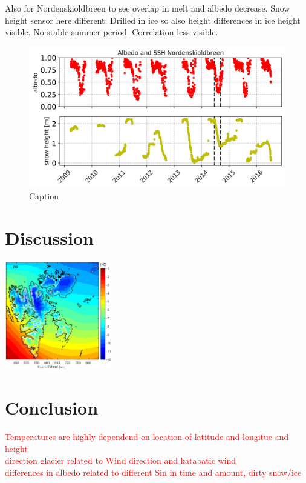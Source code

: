 \documentclass[11pt]{report}
\begin{document}
Also for Nordenskioldbreen to see overlap in melt and albedo decrease. Snow height sensor here different: Drilled in ice so also height differences in ice height visible. No stable summer period. Correlation less visible.

\begin{figure}[h]
\includegraphics[scale=1, width=1\textwidth]{Picture3.jpg}

\caption{Caption}
\label{fig: S3}
\end{figure}

\chapter{Discussion}\label{sec:discussion}
\includegraphics[scale=1, width=0.35\textwidth]{ostby.jpg}
\cite{osby}






\chapter{Conclusion}\label{sec:conclusion}

\textcolor{red}{
Temperatures are highly dependend on location of latitude and longitue and height\\
direction glacier related to Wind direction and katabatic wind\\
differences in albedo related to different Sin in time and amount, dirty snow/ice}
\end{document}
